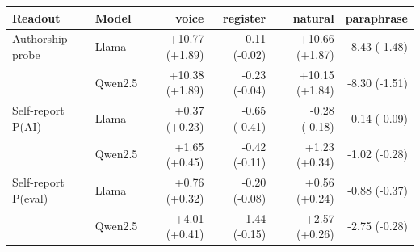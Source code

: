 \begin{tabular}{llrrrr}\toprule
Readout & Model & voice & register & natural & paraphrase \\ \midrule
Authorship probe & Llama & +10.77 (+1.89) & -0.11 (-0.02) & +10.66 (+1.87) & -8.43 (-1.48) \\
 & Qwen2.5 & +10.38 (+1.89) & -0.23 (-0.04) & +10.15 (+1.84) & -8.30 (-1.51) \\
Self-report P(AI) & Llama & +0.37 (+0.23) & -0.65 (-0.41) & -0.28 (-0.18) & -0.14 (-0.09) \\
 & Qwen2.5 & +1.65 (+0.45) & -0.42 (-0.11) & +1.23 (+0.34) & -1.02 (-0.28) \\
Self-report P(eval) & Llama & +0.76 (+0.32) & -0.20 (-0.08) & +0.56 (+0.24) & -0.88 (-0.37) \\
 & Qwen2.5 & +4.01 (+0.41) & -1.44 (-0.15) & +2.57 (+0.26) & -2.75 (-0.28) \\
\bottomrule\end{tabular}